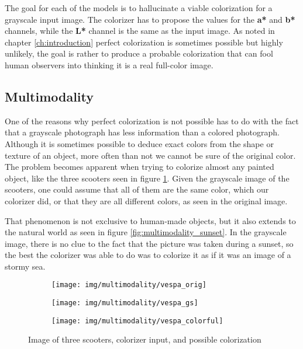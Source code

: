 The goal for each of the models is to hallucinate a viable colorization for a grayscale 
input image. The colorizer has to propose the values for the \textbf{a*} and \textbf{b*}
channels, while the \textbf{L*} channel is the same as the input image. As noted in chapter \ref{ch:introduction}
perfect colorization is sometimes possible but highly unlikely, the goal is rather to 
produce a probable colorization that can fool human observers into thinking it is a 
real full-color image.

\subsection{Multimodality}
\label{sec:multimodality}

One of the reasons why perfect colorization is not possible has to do with the 
fact that a grayscale photograph has less information than a colored photograph.
Although it is sometimes possible to deduce exact colors from the shape or texture of
an object, more often than not we cannot be sure of the original color.
The problem becomes apparent when trying to colorize almost any painted object,
like the three scooters seen in figure \ref{fig:multimodality_scooters}. Given the 
grayscale image of the scooters, one could assume that all of them are the same
color, which our colorizer did, or that they are all different colors, as seen 
in the original image. 

That phenomenon is not exclusive to human-made objects, 
but it also extends to the natural world as seen in figure 
\ref{fig:multimodality_sunset}. In the grayscale image, there is no clue to the 
fact that the picture was taken during a sunset, so the best the colorizer
was able to do was to colorize it as if it was an image of a stormy sea.

\begin{figure}
	\centering
	\begin{subfigure}{.32\textwidth}
		\centering
		\texttt{[image: img/multimodality/vespa\_orig]}
	\end{subfigure}
	\begin{subfigure}{.32\textwidth}
		\centering
		\texttt{[image: img/multimodality/vespa\_gs]}
	\end{subfigure}
    \begin{subfigure}{.32\textwidth}
		\centering
		\texttt{[image: img/multimodality/vespa\_colorful]}
	\end{subfigure}
    \caption{Image of three scooters, colorizer input, and possible colorization}
	\label{fig:multimodality_scooters}
\end{figure}

